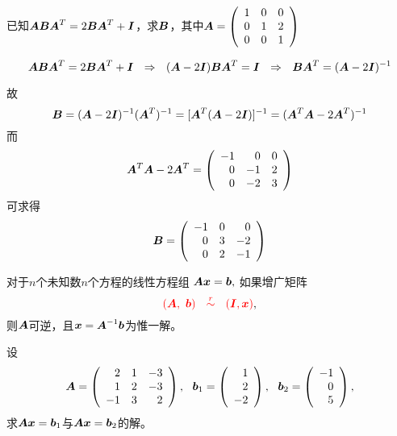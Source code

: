 \begin{li}
  已知$\MA\MB\MA^T=2\MB\MA^T+\MI$，求$\MB$，其中$
  \MA = \left(
    \begin{array}{ccc}
      1&0&0\\
      0&1&2\\
      0&0&1
    \end{array}
  \right)
  $
\end{li}




\begin{jie}
$$
\MA\MB\MA^T=2\MB\MA^T+\MI ~~ \Rightarrow ~~ (\MA-2\MI)\MB\MA^T=\MI 
~~ \Rightarrow ~~ \MB\MA^T = (\MA-2\MI)^{-1}
$$

故
$$
\MB = (\MA-2\MI)^{-1} (\MA^T)^{-1}  = [\MA^T(\MA-2\MI)]^{-1} 
=(\MA^T\MA-2\MA^T)^{-1}
$$
而
$$
\MA^T\MA-2\MA^T = \left(
  \begin{array}{rrr}
    -1&0&0\\
    0&-1&2\\
    0&-2&3
  \end{array}
\right)
$$ 
可求得
$$
\MB = \left(
  \begin{array}{rrr}
    -1&0&0\\
    0&3&-2\\
    0&2&-1
  \end{array}
\right)
$$
\end{jie}





\begin{tuilun}
  对于$n$个未知数$n$个方程的线性方程组
  $
  \MA\vx=\vb,
  $
  如果增广矩阵
  $$
  \red{(\MA,~\vb)~~\overset{r}{\sim}~~(\MI,\vx)},
  $$
  则$\MA$可逆，且$\vx=\MA^{-1}\vb$为惟一解。  
\end{tuilun}




\begin{li}
  设
  $$
  \MA = \left(
    \begin{array}{rrr}
      2&1&-3\\
      1&2&-3\\
      -1&3&2
    \end{array}
  \right),
  ~~
  \vb_1=\left(
    \begin{array}{r}
      1\\
      2\\
      -2
    \end{array}
  \right),
  ~~
  \vb_2=\left(
    \begin{array}{r}
      -1\\
      0\\
      5
    \end{array}
  \right),
  $$
  求$\MA\vx=\vb_1$与$\MA\vx=\vb_2$的解。
\end{li}




